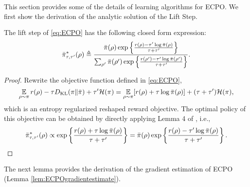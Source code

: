 This section provides some of the details of learning algorithms for ECPO.
We first show the derivation of the analytic solution of the Lift Step.
\begin{lem}
	\label{lem:opt_pi_ref}
	The lift step of \cref{eq:ECPO} has the following closed form expression:
	\begin{equation}
	\label{eq:pitautauprime1}
	\bar{\pi}_{\tau,\tau^{\prime}}^*(\rho) \triangleq \frac{\bar{\pi}(\rho) \exp\left\{ \frac{r(\rho)-\tau^{\prime} \log \bar{\pi}(\rho) }{ \tau+\tau^{\prime}} \right\}}{ \sum_{\rho^{\prime}}{\bar{\pi}(\rho^{\prime}) \exp\left\{ \frac{r(\rho^{\prime})-\tau^{\prime} \log \bar{\pi}(\rho^{\prime})}{ \tau+\tau^{\prime}} \right\} } }.
	\end{equation}
\end{lem}
\begin{proof}
	Rewrite the objective function defined in \cref{eq:ECPO},
	\begin{equation}
	\operatorname*{\mathbb{E}}\limits_{\rho \sim \pi} r(\rho)  - \tau D_{\mathrm{KL}}(\pi \| \bar{\pi}) + \tau^{\prime} \mathcal{H}(\pi) = \operatorname*{\mathbb{E}}\limits_{\rho \sim \pi} [r(\rho) + \tau \log \bar{\pi}(\rho)] + (\tau+\tau^{\prime}) \mathcal{H}(\pi),
	\end{equation}
	which is an entropy regularized reshaped reward objective. The optimal policy of this objective can be obtained by directly applying Lemma 4 of \citet{nachum2017bridging}, i.e.,
	\begin{equation}
	\label{pi_bar_star_tau_tauprime_prop_form}
	\bar{\pi}_{\tau,\tau^{\prime}}^*(\rho)\propto \exp\left\{ \frac{r(\rho)+\tau \log \bar{\pi}(\rho)}{\tau+\tau^{\prime}} \right\} = \bar{\pi}(\rho) \exp\left\{ \frac{r(\rho)-\tau^{\prime} \log \bar{\pi}(\rho)}{\tau+\tau^{\prime}} \right\}. \qedhere
	\end{equation}
\end{proof}
The next lemma provides the derivation of the gradient estimation of ECPO (Lemma \ref{lem:ECPOgradientestimate}). 
